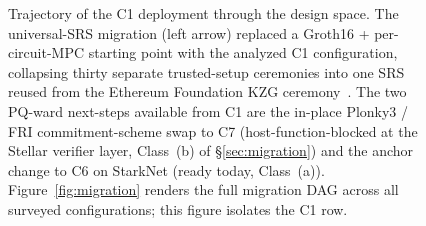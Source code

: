 \begin{figure}[t]
{}%
  \caption{Trajectory of the C1 deployment through the design
    space. The universal-SRS migration (left arrow) replaced a
    Groth16 + per-circuit-MPC starting point with the analyzed C1
    configuration, collapsing thirty separate trusted-setup
    ceremonies into one SRS reused from the Ethereum Foundation
    KZG ceremony~\cite{eth-kzg-ceremony}. The two PQ-ward
    next-steps available from C1 are the in-place Plonky3 / FRI
    commitment-scheme swap to C7 (host-function-blocked at the
    Stellar verifier layer, Class~(b) of \S\ref{sec:migration})
    and the anchor change to C6 on StarkNet (ready today,
    Class~(a)). Figure~\ref{fig:migration} renders the full
    migration DAG across all surveyed configurations; this
    figure isolates the C1 row.}
  \label{fig:trajectory}
\end{figure}
